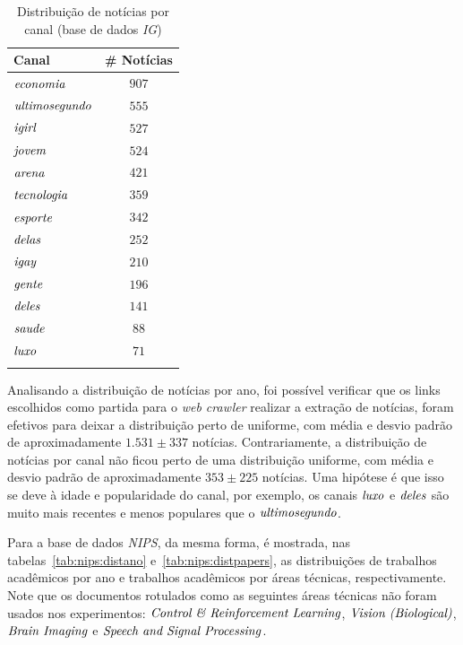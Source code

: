 \documentclass[
    12pt,                %
    oneside,            %
    a4paper,            %
    english,            %
    brazil                %
    ]{abntex2ppgsi}
\begin{document}
\begin{table}[h]
\centering
\caption{Distribuição de notícias por canal (base de dados \textit{IG})}
    \begin{tabular}{lc}
        \hline
        \textbf{Canal} & \# \textbf{Notícias} \\
        \hline
        $\text{\textit{economia}}$      & $907$ \\
        $\text{\textit{ultimosegundo}}$ & $555$ \\
        $\text{\textit{igirl}}$         & $527$ \\
        $\text{\textit{jovem}}$         & $524$ \\
        $\text{\textit{arena}}$         & $421$ \\
        $\text{\textit{tecnologia}}$    & $359$ \\
        $\text{\textit{esporte}}$       & $342$ \\
        $\text{\textit{delas}}$         & $252$ \\
        $\text{\textit{igay}}$          & $210$ \\
        $\text{\textit{gente}}$         & $196$ \\
        $\text{\textit{deles}}$         & $141$ \\
        $\text{\textit{saude}}$         & $88$  \\
        $\text{\textit{luxo}}$          & $71$  \\
        \hline
        & \\
    \end{tabular}
    \label{tab:ig:distcanal}
\end{table}

Analisando a distribuição de notícias por ano, foi possível verificar que os links escolhidos como partida para o \textit{web crawler} realizar a extração de notícias, foram efetivos para deixar a distribuição perto de uniforme, com média e desvio padrão de aproximadamente $1.531 \pm 337$ notícias.
Contrariamente, a distribuição de notícias por canal não ficou perto de uma distribuição uniforme, com média e desvio padrão de aproximadamente $353 \pm 225$ notícias.
Uma hipótese é que isso se deve à idade e popularidade do canal, por exemplo, os canais $\text{\textit{luxo}}$ e $\text{\textit{deles}}$ são muito mais recentes e menos populares que o $\text{\textit{ultimosegundo}}$.

Para a base de dados \textit{NIPS}, da mesma forma, é mostrada, nas tabelas~\ref{tab:nips:distano} e~\ref{tab:nips:distpapers}, as distribuições de trabalhos acadêmicos por ano e trabalhos acadêmicos por áreas técnicas, respectivamente.
Note que os documentos rotulados como as seguintes áreas técnicas não foram usados nos experimentos: $\text{\textit{Control \& Reinforcement Learning}}$, $\text{\textit{Vision (Biological)}}$, $\text{\textit{Brain Imaging}}$ e $\text{\textit{Speech and Signal Processing}}$.
\end{document}
